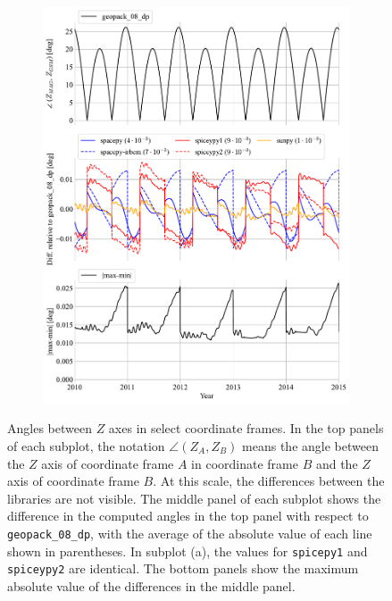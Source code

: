 \documentclass[draft]{agujournal2019}
\begin{document}
\begin{figure}[htb]
\begin{subfigure}[b]{0.49\textwidth}
         \includegraphics[width=\textwidth]{code/figures/angles/z-delta=1days_20100101-20150101/MAG_GSM.pdf}
     \end{subfigure}
     \caption{Angles between $Z$ axes in select coordinate frames. In the top panels of each subplot, the notation $\angle (Z_A, Z_B)$ means the angle between the $Z$ axis of coordinate frame $A$ in coordinate frame $B$ and the $Z$ axis of coordinate frame $B$. At this scale, the differences between the libraries are not visible. The middle panel of each subplot shows the difference in the computed angles in the top panel with respect to \texttt{geopack\_08\_dp}, with the average of the absolute value of each line shown in parentheses. In subplot (a), the values for \texttt{spicepy1} and \texttt{spiceypy2} are identical. The bottom panels show the maximum absolute value of the differences in the middle panel.}
     \label{fig:angles}
\end{figure}

\clearpage
\end{document}
